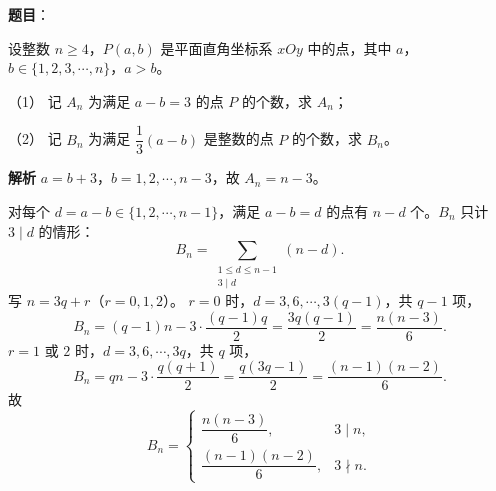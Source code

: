 \begin{answer}

\textbf{题目}：

设整数 $n\geqslant4$，$P(a,b)$ 是平面直角坐标系 $xOy$ 中的点，其中 $a$，$b\in\{1,2,3,\cdots,n\}$，$a>b$。

（1） 记 $A_n$ 为满足 $a-b=3$ 的点 $P$ 的个数，求 $A_n$；

（2） 记 $B_n$ 为满足 $\dfrac13(a-b)$ 是整数的点 $P$ 的个数，求 $B_n$。

\textbf{解析}
$a=b+3$，$b=1,2,\cdots,n-3$，故 $A_n=n-3$。

对每个 $d=a-b\in\{1,2,\cdots,n-1\}$，满足 $a-b=d$ 的点有 $n-d$ 个。$B_n$ 只计 $3\mid d$ 的情形：
\nopagebreak[4]
\[B_n=\sum_{\substack{1\leqslant d\leqslant n-1\\3\mid d}}(n-d).\]
写 $n=3q+r$（$r=0,1,2$）。
$r=0$ 时，$d=3,6,\cdots,3(q-1)$，共 $q-1$ 项，
\nopagebreak[4]
\[B_n=(q-1)n-3\cdot\frac{(q-1)q}2=\frac{3q(q-1)}2=\frac{n(n-3)}6.\]
$r=1$ 或 $2$ 时，$d=3,6,\cdots,3q$，共 $q$ 项，
\nopagebreak[4]
\[B_n=qn-3\cdot\frac{q(q+1)}2=\frac{q(3q-1)}2=\frac{(n-1)(n-2)}6.\]
故
\nopagebreak[4]
\[B_n=\begin{cases}\dfrac{n(n-3)}6,&3\mid n,\\[4pt]\dfrac{(n-1)(n-2)}6,&3\nmid n.\end{cases}\]



\end{answer}